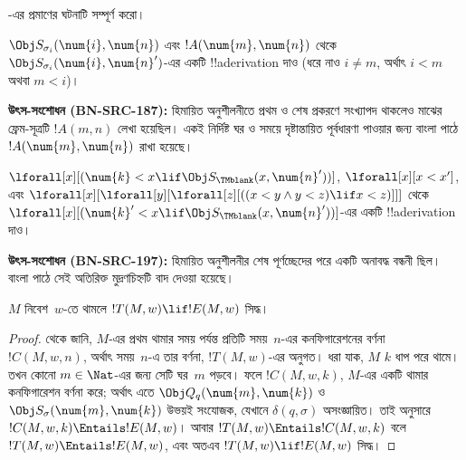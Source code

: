 \documentclass[../../../include/open-logic-section]{subfiles}
\begin{document}
\begin{prob}
-এর প্রমাণের
 ঘটনাটি সম্পূর্ণ করো।
\end{prob}

\begin{prob}
$\Obj S_{\sigma_i}(\num{i},\num{n})$ এবং
$!A(\num{m},\num{n})$ থেকে
$\Obj S_{\sigma_i}(\num{i},\num{n}')$-এর একটি !!a{derivation} দাও
(ধরে নাও $i\neq m$, অর্থাৎ $i<m$ অথবা $m<i$)।
\par\smallskip\noindent\textnormal{\small\textbf{উৎস-সংশোধন (BN-SRC-187):} হিমায়িত অনুশীলনীতে প্রথম ও শেষ প্রকরণে সংখ্যাপদ থাকলেও মাঝের ফ্রেম-সূত্রটি $!A(m,n)$ লেখা হয়েছিল। একই নির্দিষ্ট ঘর ও সময়ে দৃষ্টান্তায়িত পূর্বধারণা পাওয়ার জন্য বাংলা পাঠে $!A(\num{m},\num{n})$ রাখা হয়েছে।} %
\end{prob}

\begin{prob}
$\lforall[x][(\num{k}<x\lif\Obj S_\TMblank(x,\num{n}'))]$,
$\lforall[x][x<x']$, এবং
$\lforall[x][\lforall[y][\lforall[z][((x<y\land y<z)\lif x<z)]]]$
থেকে
$\lforall[x][(\num{k}'<x\lif\Obj S_\TMblank(x,\num{n}'))]$-এর একটি
!!a{derivation} দাও।
\par\smallskip\noindent\textnormal{\small\textbf{উৎস-সংশোধন (BN-SRC-197):} হিমায়িত অনুশীলনীর শেষ পূর্ণচ্ছেদের পরে একটি অনাবদ্ধ বন্ধনী ছিল। বাংলা পাঠে সেই অতিরিক্ত মুদ্রণচিহ্নটি বাদ দেওয়া হয়েছে।} %
\end{prob}

\begin{lem}
$M$ নিবেশ~$w$-তে থামলে $!T(M,w)\lif !E(M,w)$ সিদ্ধ।
\end{lem}

\begin{proof}
 থেকে জানি, $M$-এর প্রথম থামার সময় পর্যন্ত প্রতিটি
সময়~$n$-এর কনফিগারেশনের বর্ণনা~$!C(M,w,n)$, অর্থাৎ সময়~$n$-এ তার বর্ণনা,
$!T(M,w)$-এর অনুগত। ধরা যাক, $M$ $k$ ধাপ পরে থামে। তখন কোনো
$m\in\Nat$-এর জন্য সেটি ঘর~$m$ পড়বে। ফলে $!C(M,w,k)$, $M$-এর একটি
থামার কনফিগারেশন বর্ণনা করে; অর্থাৎ এতে
$\Obj Q_q(\num{m},\num{k})$ ও $\Obj S_\sigma(\num{m},\num{k})$ উভয়ই
সংযোজক, যেখানে $\delta(q,\sigma)$ অসংজ্ঞায়িত। তাই
 অনুসারে
$!C(M,w,k)\Entails !E(M,w)$। আবার
$!T(M,w)\Entails !C(M,w,k)$ বলে
$!T(M,w)\Entails !E(M,w)$, এবং অতএব $!T(M,w)\lif !E(M,w)$ সিদ্ধ।
\end{proof}
\end{document}
